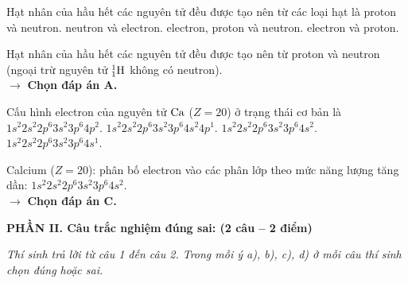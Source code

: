 \documentclass[11pt,a4paper]{article}
\begin{document}
\begin{ex}%
Hạt nhân của hầu hết các nguyên tử đều được tạo nên từ các loại hạt là
\choice
{\True proton và neutron.}
{neutron và electron.}
{electron, proton và neutron.}
{electron và proton.}
\begin{loigiai}
Hạt nhân của hầu hết các nguyên tử đều được tạo nên từ proton và neutron (ngoại trừ nguyên tử $^1_1\ce{H}$ không có neutron).\\
$\rightarrow$ \textbf{Chọn đáp án A.}
\end{loigiai}
\end{ex}

\begin{ex}%
Cấu hình electron của nguyên tử $\ce{Ca}$ ($Z = 20$) ở trạng thái cơ bản là
\choice
{$1s^2 2s^2 2p^6 3s^2 3p^6 4p^2$.}
{$1s^2 2s^2 2p^6 3s^2 3p^6 4s^2 4p^1$.}
{\True $1s^2 2s^2 2p^6 3s^2 3p^6 4s^2$.}
{$1s^2 2s^2 2p^6 3s^2 3p^6 4s^1$.}
\begin{loigiai}
Calcium ($Z = 20$): phân bố electron vào các phân lớp theo mức năng lượng tăng dần: $1s^2 2s^2 2p^6 3s^2 3p^6 4s^2$.\\
$\rightarrow$ \textbf{Chọn đáp án C.}
\end{loigiai}
\end{ex}

\vspace{6pt}
\noindent
\textbf{\large\color{mainGreen}PHẦN II. Câu trắc nghiệm đúng sai: (2 câu – 2 điểm)}

\textit{Thí sinh trả lời từ câu 1 đến câu 2. Trong mỗi ý a), b), c), d) ở mỗi câu thí sinh chọn đúng hoặc sai.}
\vspace{4pt}
\end{document}
